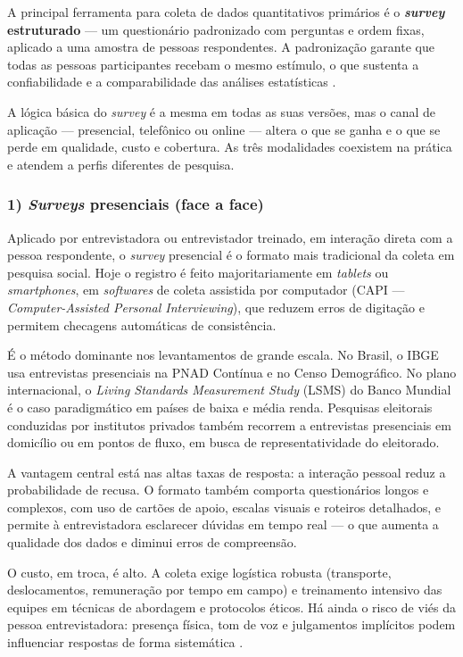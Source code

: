 \documentclass[12pt, a4paper, openany]{book}
\begin{document}
A principal ferramenta para coleta de dados quantitativos prim\'arios \'e o \textbf{\textit{survey} estruturado} --- um question\'ario padronizado com perguntas e ordem fixas, aplicado a uma amostra de pessoas respondentes. A padroniza\c{c}\~ao garante que todas as pessoas participantes recebam o mesmo est\'imulo, o que sustenta a confiabilidade e a comparabilidade das an\'alises estat\'isticas \citep{bryman2012social}.

A l\'ogica b\'asica do \textit{survey} \'e a mesma em todas as suas vers\~oes, mas o canal de aplica\c{c}\~ao --- presencial, telef\^onico ou online --- altera o que se ganha e o que se perde em qualidade, custo e cobertura. As tr\^es modalidades coexistem na pr\'atica e atendem a perfis diferentes de pesquisa.

\subsubsection*{1) \textit{Surveys} presenciais (face a face)}

Aplicado por entrevistadora ou entrevistador treinado, em intera\c{c}\~ao direta com a pessoa respondente, o \textit{survey} presencial \'e o formato mais tradicional da coleta em pesquisa social. Hoje o registro \'e feito majoritariamente em \textit{tablets} ou \textit{smartphones}, em \textit{softwares} de coleta assistida por computador (CAPI --- \textit{Computer-Assisted Personal Interviewing}), que reduzem erros de digita\c{c}\~ao e permitem checagens autom\'aticas de consist\^encia.

\'E o m\'etodo dominante nos levantamentos de grande escala. No Brasil, o IBGE usa entrevistas presenciais na PNAD Cont\'inua e no Censo Demogr\'afico. No plano internacional, o \textit{Living Standards Measurement Study} (LSMS) do Banco Mundial \'e o caso paradigm\'atico em pa\'ises de baixa e m\'edia renda. Pesquisas eleitorais conduzidas por institutos privados tamb\'em recorrem a entrevistas presenciais em domic\'ilio ou em pontos de fluxo, em busca de representatividade do eleitorado.

A vantagem central est\'a nas altas taxas de resposta: a intera\c{c}\~ao pessoal reduz a probabilidade de recusa. O formato tamb\'em comporta question\'arios longos e complexos, com uso de cart\~oes de apoio, escalas visuais e roteiros detalhados, e permite \`a entrevistadora esclarecer d\'uvidas em tempo real --- o que aumenta a qualidade dos dados e diminui erros de compreens\~ao.

O custo, em troca, \'e alto. A coleta exige log\'istica robusta (transporte, deslocamentos, remunera\c{c}\~ao por tempo em campo) e treinamento intensivo das equipes em t\'ecnicas de abordagem e protocolos \'eticos. H\'a ainda o risco de vi\'es da pessoa entrevistadora: presen\c{c}a f\'isica, tom de voz e julgamentos impl\'icitos podem influenciar respostas de forma sistem\'atica \citep{neuman2012designing,bryman2012social}.
\end{document}
